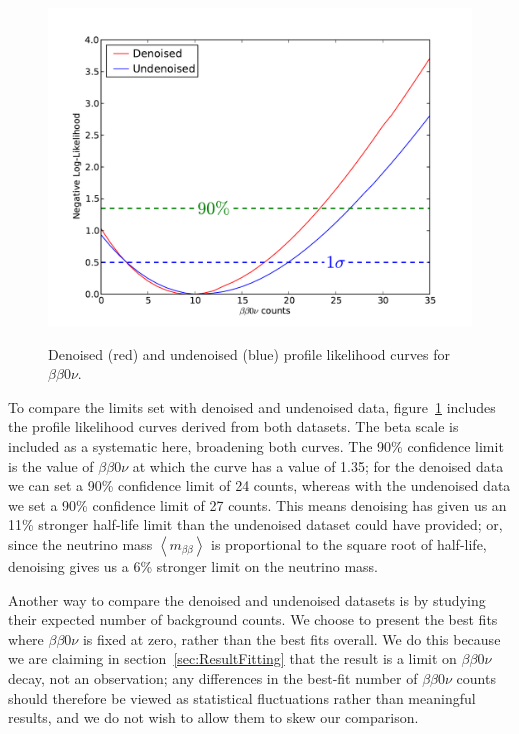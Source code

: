 \begin{figure}
\begin{center}
\includegraphics[keepaspectratio=true,width=\textwidth]{DenoisedVsUndenoised_bb0nProfiles.pdf}
\end{center}
\renewcommand{\baselinestretch}{1}
\small\normalsize
\begin{quote}
\caption{Denoised (red) and undenoised (blue) profile likelihood curves for $\beta\beta 0\nu$.}
\label{fig:DenoisedComparison_Profiles}
\end{quote}
\end{figure}
\renewcommand{\baselinestretch}{2}
\small\normalsize

To compare the limits set with denoised and undenoised data, figure~\ref{fig:DenoisedComparison_Profiles} includes the profile likelihood curves derived from both datasets.  The beta scale is included as a systematic here, broadening both curves.  The 90\% confidence limit is the value of $\beta\beta 0\nu$ at which the curve has a value of 1.35; for the denoised data we can set a 90\% confidence limit of 24 counts, whereas with the undenoised data we set a 90\% confidence limit of 27 counts.  This means denoising has given us an 11\% stronger half-life limit than the undenoised dataset could have provided; or, since the neutrino mass $\left<m_{\beta\beta}\right>$ is proportional to the square root of half-life, denoising gives us a 6\% stronger limit on the neutrino mass.

Another way to compare the denoised and undenoised datasets is by studying their expected number of background counts.  We choose to present the best fits where $\beta\beta 0\nu$ is fixed at zero, rather than the best fits overall.  We do this because we are claiming in section~\ref{sec:ResultFitting} that the result is a limit on $\beta\beta 0\nu$ decay, not an observation; any differences in the best-fit number of $\beta\beta 0\nu$ counts should therefore be viewed as statistical fluctuations rather than meaningful results, and we do not wish to allow them to skew our comparison.

